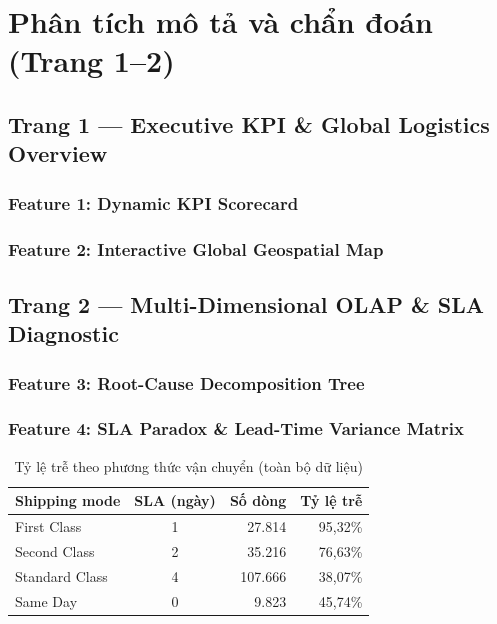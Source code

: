 \chapter{Phân tích mô tả và chẩn đoán (Trang 1--2)}
\label{chap:descriptive}

\section{Trang 1 --- Executive KPI \& Global Logistics Overview}
\subsection{Feature 1: Dynamic KPI Scorecard}
\subsection{Feature 2: Interactive Global Geospatial Map}

\section{Trang 2 --- Multi-Dimensional OLAP \& SLA Diagnostic}
\subsection{Feature 3: Root-Cause Decomposition Tree}
\subsection{Feature 4: SLA Paradox \& Lead-Time Variance Matrix}
\begin{table}[H]
\centering
\caption{Tỷ lệ trễ theo phương thức vận chuyển (toàn bộ dữ liệu)}
\begin{tabular}{lcrr}
\toprule
\textbf{Shipping mode} & \textbf{SLA (ngày)} & \textbf{Số dòng} & \textbf{Tỷ lệ trễ} \\ \midrule
First Class    & 1 & 27.814  & 95,32\% \\
Second Class   & 2 & 35.216  & 76,63\% \\
Standard Class & 4 & 107.666 & 38,07\% \\
Same Day       & 0 & 9.823   & 45,74\% \\
\bottomrule
\end{tabular}
\end{table}
